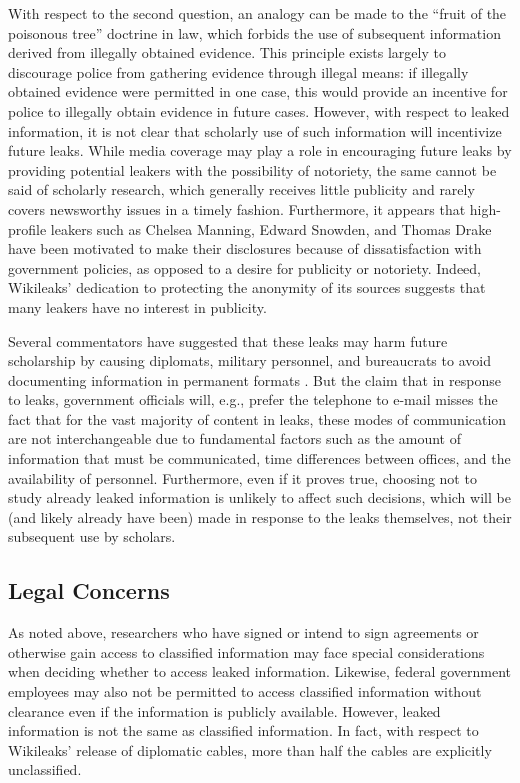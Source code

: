 \documentclass[12pt]{article}
\begin{document}
With respect to the second question, an analogy can be made to the ``fruit of the poisonous tree'' 
doctrine in law, which forbids the use of subsequent information derived from illegally obtained 
evidence. This principle exists largely to discourage police from 
gathering evidence through illegal means: if illegally obtained evidence were permitted in one 
case, this would provide an incentive for police to illegally obtain evidence in future cases. 
However, with respect to leaked information, it is not clear 
that scholarly use of such information will incentivize future leaks.
While media coverage may play a role in encouraging future leaks by providing 
potential leakers with the possibility of notoriety, the same cannot be said of scholarly research, 
which generally receives little publicity and rarely covers newsworthy issues in a timely fashion.
Furthermore, it appears that high-profile leakers such as Chelsea Manning, Edward Snowden, and 
Thomas Drake have 
been motivated to make their disclosures because of dissatisfaction with government policies, as 
opposed to a desire for publicity or notoriety. Indeed, Wikileaks' dedication to protecting the anonymity of 
its sources suggests that many leakers have no interest in publicity.

Several commentators have suggested that these leaks may harm future scholarship by causing 
diplomats, military personnel, and bureaucrats to avoid documenting information in permanent 
formats \citep{drezner2010why,simmons2011international}. 
But the claim that in response to leaks, government 
officials will, e.g., prefer the telephone to e-mail misses the fact that for the vast majority of 
content in leaks, these modes of communication are not interchangeable due to fundamental factors such as the 
amount of information that must be communicated, time differences between offices, and the availability of 
personnel. Furthermore, even if it proves true, choosing not to study already leaked 
information is unlikely to affect 
such decisions, which will be (and likely already have been) made in response to 
the leaks themselves, not their subsequent use by scholars.

\subsection{Legal Concerns}

As noted above, researchers who have signed or intend to sign agreements or otherwise gain access to classified information 
may face special considerations when deciding whether to access leaked information. Likewise, federal government 
employees may also not be permitted to 
access classified information without clearance even if the information is publicly available. However, 
leaked information is not the same as classified information. In fact, with respect to 
Wikileaks' release of diplomatic cables, more than half the cables are explicitly unclassified.
\end{document}
